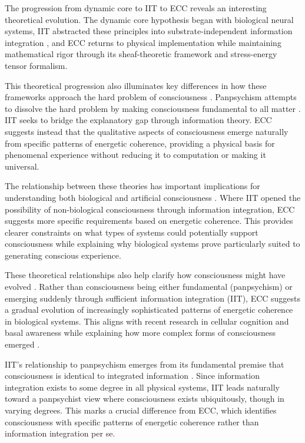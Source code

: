 \begin{refsection}
The progression from dynamic core to IIT to ECC reveals an interesting theoretical evolution. The dynamic core hypothesis began with biological neural systems, IIT abstracted these principles into substrate-independent information integration \cite{Tononi2015}, and ECC returns to physical implementation while maintaining mathematical rigor through its sheaf-theoretic framework and stress-energy tensor formalism.

This theoretical progression also illuminates key differences in how these frameworks approach the hard problem of consciousness \cite{Chalmers2015}. Panpsychism attempts to dissolve the hard problem by making consciousness fundamental to all matter \cite{Strawson2006}. IIT seeks to bridge the explanatory gap through information theory. ECC suggests instead that the qualitative aspects of consciousness emerge naturally from specific patterns of energetic coherence, providing a physical basis for phenomenal experience without reducing it to computation or making it universal.

The relationship between these theories has important implications for understanding both biological and artificial consciousness \cite{Koch2019}. Where IIT opened the possibility of non-biological consciousness through information integration, ECC suggests more specific requirements based on energetic coherence. This provides clearer constraints on what types of systems could potentially support consciousness while explaining why biological systems prove particularly suited to generating conscious experience.

These theoretical relationships also help clarify how consciousness might have evolved \cite{Goff2019}. Rather than consciousness being either fundamental (panpsychism) or emerging suddenly through sufficient information integration (IIT), ECC suggests a gradual evolution of increasingly sophisticated patterns of energetic coherence in biological systems. This aligns with recent research in cellular cognition and basal awareness while explaining how more complex forms of consciousness emerged \cite{Mathews2011}.

IIT's relationship to panpsychism emerges from its fundamental premise that consciousness is identical to integrated information \cite{Tononi2016}. Since information integration exists to some degree in all physical systems, IIT leads naturally toward a panpsychist view where consciousness exists ubiquitously, though in varying degrees. This marks a crucial difference from ECC, which identifies consciousness with specific patterns of energetic coherence rather than information integration per se.


\end{refsection}

